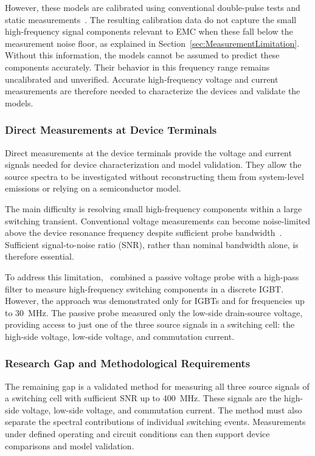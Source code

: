 However, these models are calibrated using conventional double-pulse tests and static measurements~\cite{van_der_broeck_simulating_2023,kragl_semiconductor-focused_2025}.
The resulting calibration data do not capture the small high-frequency signal components relevant to EMC when these fall below the measurement noise floor, as explained in Section~\ref{sec:MeasurementLimitation}.
Without this information, the models cannot be assumed to predict these components accurately.
Their behavior in this frequency range remains uncalibrated and unverified.
Accurate high-frequency voltage and current measurements are therefore needed to characterize the devices and validate the models.

\subsubsection*{Direct Measurements at Device Terminals}

Direct measurements at the device terminals provide the voltage and current signals needed for device characterization and model validation.
They allow the source spectra to be investigated without reconstructing them from system-level emissions or relying on a semiconductor model.

The main difficulty is resolving small high-frequency components within a large switching transient.
Conventional voltage measurements can become noise-limited above the device resonance frequency despite sufficient probe bandwidth~\cite{labrousse_switching_2011,kragl_impact_2024}.
Sufficient signal-to-noise ratio (SNR), rather than nominal bandwidth alone, is therefore essential.

To address this limitation,~\cite{oswald_high-bandwidth_2011} combined a passive voltage probe with a high-pass filter to measure high-frequency switching components in a discrete IGBT\@.
However, the approach was demonstrated only for IGBTs and for frequencies up to \SI{30}{MHz}.
The passive probe measured only the low-side drain-source voltage, providing access to just one of the three source signals in a switching cell: the high-side voltage, low-side voltage, and commutation current.

\subsubsection*{Research Gap and Methodological Requirements}
The remaining gap is a validated method for measuring all three source signals of a switching cell with sufficient SNR up to \SI{400}{MHz}.
These signals are the high-side voltage, low-side voltage, and commutation current.
The method must also separate the spectral contributions of individual switching events.
Measurements under defined operating and circuit conditions can then support device comparisons and model validation.

